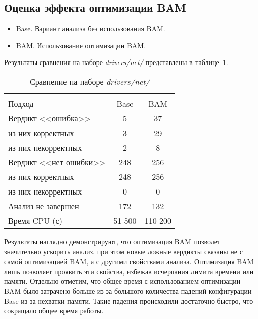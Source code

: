\subsection{Оценка эффекта оптимизации BAM}

\begin{itemize}
\item Base. Вариант анализа без использования BAM.
\item BAM. Использование оптимизации BAM.
\end{itemize}

Результаты сравнения на наборе \textit{drivers/net/} представлены в таблице~\ref{table-drivers-bam}.

  \begin{table}[h]\footnotesize \centering
    \caption{Сравнение на наборе \textit{drivers/net/}}
  	\label{table-drivers-bam}
    \begin{tabular}{ | l | c | c | }
      \hline
      		& 		\multicolumn{2}{c|}{\combatmode}  \\
      Подход         				& Base  	& BAM 	\\ \hline
      Вердикт <<ошибка>> 			& 5   		& 37    \\ 
  \hspace{0.5cm} из них корректных 	& 3 		& 29 	\\ 
  \hspace{0.5cm} из них некорректных & 2		& 8 	\\ \hline
      Вердикт <<нет ошибки>>  		& 248    	& 256    \\ 
  \hspace{0.5cm} из них корректных 	& 248 		& 256    \\
  \hspace{0.5cm} из них некорректных & 0 		& 0    	\\ \hline
      Анализ не завершен       		& 172    	& 132    \\ \hline
      Время CPU (с)   				& 51 500 	& 110 200 \\ 
      \hline
    \end{tabular}
  \end{table}

Результаты наглядно демонстрируют, что оптимизация BAM позволет значительно ускорить анализ, при этом новые ложные вердикты связаны не с самой оптимизацией BAM, а с другими свойствами анализа.
Оптимизация BAM лишь позволяет проявить эти свойства, избежав исчерпания лимита времени или памяти.
Отдельно отметим, что общее время с использованием оптимизации BAM было затрачено больше из-за большого количества падений конфигурации Base из-за нехватки памяти. 
Такие падения происходили достаточно быстро, что сокращало общее время работы.

